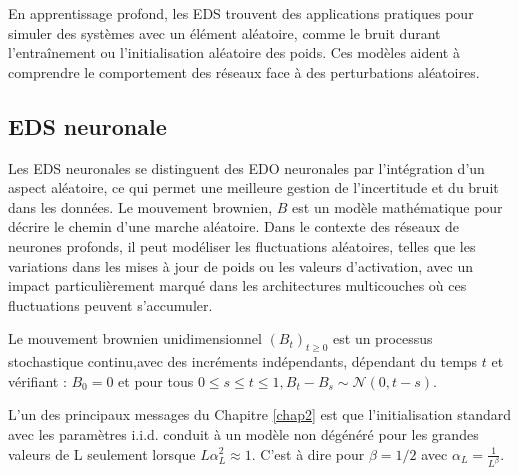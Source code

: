 En apprentissage profond, les EDS trouvent des applications pratiques pour simuler des systèmes avec un élément aléatoire, comme le bruit durant l'entraînement ou l'initialisation aléatoire des poids. Ces modèles aident à comprendre le comportement des réseaux face à des perturbations aléatoires.

\subsection{EDS neuronale}
Les EDS neuronales se distinguent des EDO neuronales par l'intégration d'un aspect aléatoire, ce qui permet une meilleure gestion de l'incertitude et du bruit dans les données. Le mouvement brownien, $B$ est un modèle mathématique pour décrire le chemin d'une marche aléatoire. Dans le contexte des réseaux de neurones profonds, il peut modéliser les fluctuations aléatoires, telles que les variations dans les mises à jour de poids ou les valeurs d'activation, avec un impact particulièrement marqué dans les architectures multicouches où ces fluctuations peuvent s'accumuler.

\begin{definition}
Le mouvement brownien unidimensionnel $(B_t)_{t \geqslant 0} $ est un processus stochastique continu,avec des incréments indépendants, dépendant du temps $t$ et vérifiant : $B_0 = 0$ et pour tous $0 \leqslant s \le t \leqslant 1, B_t - B_s \sim \mathcal{N}(0,t-s)$.
\end{definition}

L'un des principaux messages du Chapitre \ref{chap2} est que l'initialisation standard avec les paramètres i.i.d. conduit à un modèle non dégénéré pour les grandes valeurs de L seulement lorsque $L\alpha_L^2 \approx 1$. C'est à dire pour $\beta = 1/2$ avec $\alpha_L=\frac{1}{L^{\beta}}$.

